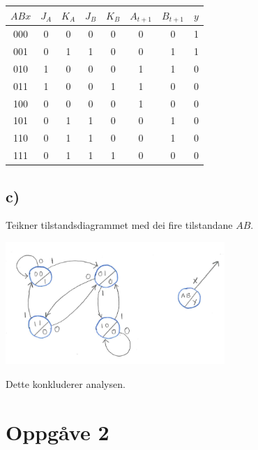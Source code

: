 \documentclass[12pt,a4paper]{article}
\begin{document}
      \begin{center}
        \begin{tabular}{ |c| c|c|c|c| c|c| c| }
          \hline
          $ABx$ & $J_A$ & $K_A$ & $J_B$ & $K_B$ & $A_{t+1}$ & $B_{t+1}$ & $y$ \\
          \hline
          000 & 0 & 0 & 0 & 0 & 0 & 0 & 1 \\
          \hline
          001 & 0 & 1 & 1 & 0 & 0 & 1 & 1 \\
          \hline
          010 & 1 & 0 & 0 & 0 & 1 & 1 & 0 \\
          \hline
          011 & 1 & 0 & 0 & 1 & 1 & 0 & 0 \\
          \hline
          100 & 0 & 0 & 0 & 0 & 1 & 0 & 0 \\
          \hline
          101 & 0 & 1 & 1 & 0 & 0 & 1 & 0 \\
          \hline
          110 & 0 & 1 & 1 & 0 & 0 & 1 & 0 \\
          \hline
          111 & 0 & 1 & 1 & 1 & 0 & 0 & 0 \\
          \hline
        \end{tabular}
      \end{center}
    \subsection{c)}
      Teikner tilstandsdiagrammet med dei fire tilstandane $AB$.
      \begin{center}
        \includegraphics[width=83mm]{04_1c}
      \end{center}
      Dette konkluderer analysen.


  \section{Oppgåve 2}
\end{document}
